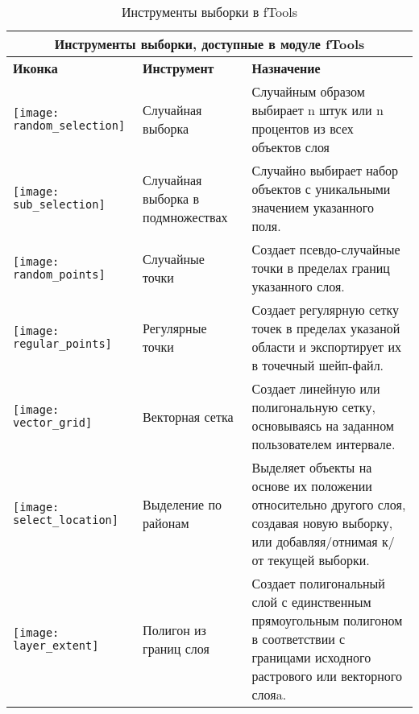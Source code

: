 \begin{table}[ht]
\centering
 \begin{tabular}{|m{1cm}|m{3cm}|m{9cm}|}
 \hline \multicolumn{3}{|c|}{\textbf{Инструменты выборки, доступные в  модуле fTools}} \\
 \hline \textbf{Иконка} & \textbf{Инструмент} & \textbf{Назначение} \\
 \hline \texttt{[image: random\_selection]} & Случайная выборка & Случайным
 образом выбирает n штук или n процентов из всех объектов слоя \\
 \hline \texttt{[image: sub\_selection]} & Случайная выборка
 в подмножествах & Случайно выбирает набор объектов с уникальными значением указанного поля. \\
 \hline \texttt{[image: random\_points]} & Случайные точки & Создает
 псевдо-случайные точки в пределах границ указанного слоя. \\
 \hline \texttt{[image: regular\_points]} & Регулярные точки & Создает
 регулярную сетку точек в пределах указаной области и экспортирует их в точечный шейп-файл. \\
 \hline \texttt{[image: vector\_grid]} & Векторная сетка & Создает
 линейную или полигональную сетку, основываясь на заданном пользователем интервале. \\
 \hline \texttt{[image: select\_location]} & Выделение по районам &
 Выделяет объекты на основе их положении относительно другого слоя, создавая новую
 выборку, или добавляя/отнимая к/от текущей выборки. \\
 \hline \texttt{[image: layer\_extent]} & Полигон из границ слоя &
 Создает полигональный слой с единственным прямоугольным полигоном в соответствии
 с границами исходного растрового или векторного слояa. \\
 \hline
\end{tabular}
\caption{Инструменты выборки в fTools}\label{tab:ftool_research}
\end{table}


